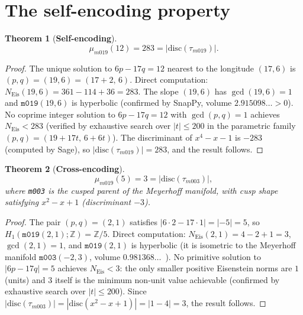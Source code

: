 \documentclass[11pt,a4paper]{article}
\newtheorem{theorem}{Theorem}
\theoremstyle{definition}
\theoremstyle{remark}
\newcommand{\Z}{\mathbb{Z}}
\newcommand{\mfld}[1]{\texttt{#1}}
\newcommand{\NEis}{N_{\mathrm{Eis}}}
\begin{document}
\section{The self-encoding property}

\begin{theorem}[\textbf{Self-encoding}]\label{thm:self}
\begin{equation}
\mu_{m019}(12) = 283 = |\mathrm{disc}(\tau_{m019})|.
\label{eq:self}
\end{equation}
\end{theorem}

\begin{proof}
The unique solution to $6p - 17q = 12$ nearest to the
longitude $(17,6)$ is $(p,q) = (19,6) = (17+2,\, 6)$.
Direct computation:
$\NEis(19,6) = 361 - 114 + 36 = 283$.
The slope $(19,6)$ has $\gcd(19,6)=1$ and
$\mfld{m019}(19,6)$ is hyperbolic (confirmed by SnapPy,
volume $2.915098\ldots > 0$).
No coprime integer solution to $6p-17q=12$
with $\gcd(p,q)=1$ achieves $\NEis < 283$
(verified by exhaustive search over $|t|\leq 200$
in the parametric family $(p,q) = (19+17t,\, 6+6t)$).
The discriminant of $x^4-x-1$ is $-283$ (computed by Sage),
so $|\mathrm{disc}(\tau_{m019})| = 283$, and the result follows.
\end{proof}

\begin{theorem}[\textbf{Cross-encoding}]\label{thm:cross}
\begin{equation}
\mu_{m019}(5) = 3 = |\mathrm{disc}(\tau_{m003})|,
\label{eq:cross}
\end{equation}
where \mfld{m003} is the cusped parent of the
Meyerhoff manifold, with cusp shape satisfying
$x^2 - x + 1$ (discriminant $-3$).
\end{theorem}

\begin{proof}
The pair $(p,q)=(2,1)$ satisfies $|6\cdot2 - 17\cdot1| = |{-5}| = 5$,
so $H_1(\mfld{m019}(2,1);\Z) = \Z/5$.
Direct computation: $\NEis(2,1) = 4 - 2 + 1 = 3$,
$\gcd(2,1)=1$, and $\mfld{m019}(2,1)$ is hyperbolic
(it is isometric to the Meyerhoff manifold
$\mfld{m003}(-2,3)$, volume $0.981368\ldots$~\cite{GMM,GentryDual}).
No primitive solution to $|6p-17q|=5$ achieves $\NEis < 3$:
the only smaller positive Eisenstein norms are $1$ (units)
and $3$ itself is the minimum non-unit value achievable
(confirmed by exhaustive search over $|t|\leq 200$).
Since $|\mathrm{disc}(\tau_{m003})| = |\mathrm{disc}(x^2-x+1)|
= |1 - 4| = 3$, the result follows.
\end{proof}
\end{document}
